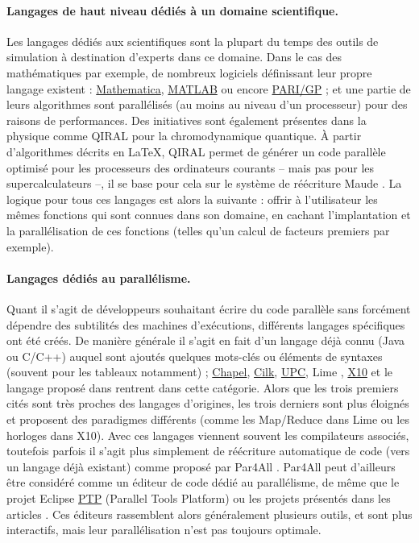 \paragraph{Langages de haut niveau dédiés à un domaine scientifique.}
Les langages dédiés aux scientifiques sont la plupart du temps des outils de simulation à destination d'experts dans ce domaine. Dans le cas des mathématiques par exemple, de nombreux logiciels définissant leur propre langage existent : \textsf{\href{http://www.wolfram.com/mathematica/}{Mathematica}}, \textsf{\href{http://fr.mathworks.com/}{MATLAB}} ou encore \textsf{\href{http://pari.math.u-bordeaux.fr/}{PARI/GP}} ; et une partie de leurs algorithmes sont parallélisés (au moins au niveau d'un processeur) pour des raisons de performances. Des initiatives sont également présentes dans la physique comme \textsf{QIRAL} \cite{Art13,Art14} pour la chromodynamique quantique. À partir d'algorithmes décrits en \LaTeX, \textsf{QIRAL} permet de générer un code parallèle optimisé pour les processeurs des ordinateurs courants -- mais pas pour les supercalculateurs --, il se base pour cela sur le système de réécriture \textsf{Maude} \cite{Art12}. La logique pour tous ces langages est alors la suivante : offrir à l'utilisateur les mêmes fonctions qui sont connues dans son domaine, en cachant l'implantation et la parallélisation de ces fonctions (telles qu'un calcul de facteurs premiers par exemple).

\paragraph{Langages dédiés au parallélisme.}
Quant il s'agit de développeurs souhaitant écrire du code parallèle sans forcément dépendre des subtilités des machines d'exécutions, différents langages spécifiques ont été créés. De manière générale il s'agit en fait d'un langage déjà connu (\textsf{Java} ou \textsf{C/C++}) auquel sont ajoutés quelques mots-clés ou éléments de syntaxes (souvent pour les tableaux notamment) ; \textsf{\href{http://chapel.cray.com/}{Chapel}}, \textsf{\href{https://www.cilkplus.org/}{Cilk}}, \textsf{\href{http://upc.lbl.gov/}{UPC}}, \textsf{Lime} \cite{Art8}, \textsf{\href{http://x10-lang.org/}{X10}} et le langage proposé dans\cite{Art10} rentrent dans cette catégorie. Alors que les trois premiers cités sont très proches des langages d'origines, les trois derniers sont plus éloignés et proposent des paradigmes différents (comme les Map/Reduce dans \textsf{Lime} ou les horloges dans \textsf{X10}). Avec ces langages viennent souvent les compilateurs associés, toutefois parfois il s'agit plus simplement de réécriture automatique de code (vers un langage déjà existant) comme proposé par \textsf{Par4All} \cite{Ths2}. \textsf{Par4All} peut d'ailleurs être considéré comme un éditeur de code dédié au parallélisme, de même que le projet \textsf{Eclipse \href{http://www.eclipse.org/ptp/}{PTP}} (Parallel Tools Platform) ou les projets présentés dans les articles \cite{Art23,Art25}. Ces éditeurs rassemblent alors généralement plusieurs outils, et sont plus interactifs, mais leur parallélisation n'est pas toujours optimale.

